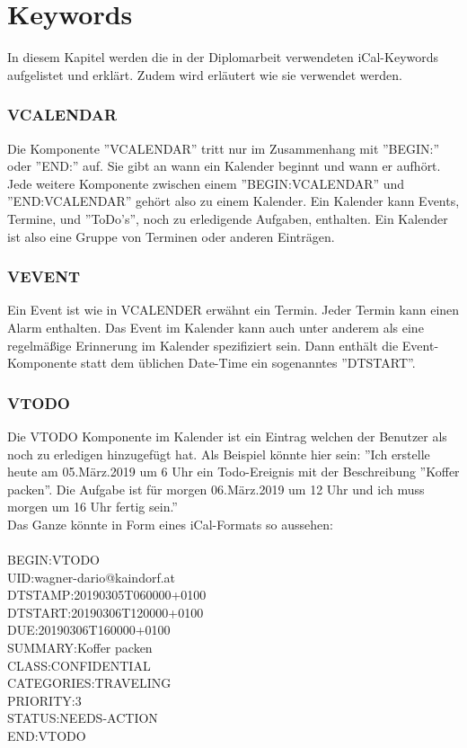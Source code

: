 \section{Keywords} 
\label{sec:keywords}
\renewcommand{\theauthor}{Dario Wagner}
In diesem Kapitel werden die in der Diplomarbeit verwendeten iCal-Keywords aufgelistet und erklärt. Zudem wird erläutert wie sie verwendet werden. 
\subsubsection{VCALENDAR}
\label{sec:vCalendar}
Die Komponente ''VCALENDAR'' tritt nur im Zusammenhang mit ''BEGIN:'' oder ''END:'' auf. Sie gibt an wann ein Kalender beginnt und wann er aufhört. Jede weitere Komponente zwischen einem ''BEGIN:VCALENDAR'' und ''END:VCALENDAR'' gehört also zu einem Kalender. Ein Kalender kann Events, Termine, und ''ToDo's'', noch zu erledigende Aufgaben, enthalten. Ein Kalender ist also eine Gruppe von Terminen oder anderen Einträgen. 
\subsubsection{VEVENT} 
\label{sec:vEvent}
Ein Event ist wie in VCALENDER erwähnt ein Termin. Jeder Termin kann einen Alarm enthalten. Das Event im Kalender kann auch unter anderem als eine regelmäßige Erinnerung im Kalender spezifiziert sein. Dann enthält die Event-Komponente statt dem üblichen Date-Time ein sogenanntes ''DTSTART''.
\subsubsection{VTODO}
\label{sec:vTodo} 
Die VTODO Komponente im Kalender ist ein Eintrag welchen der Benutzer als noch zu erledigen hinzugefügt hat. Als Beispiel könnte hier sein: ''Ich erstelle heute am 05.März.2019 um 6 Uhr ein Todo-Ereignis mit der Beschreibung ''Koffer packen''. Die Aufgabe ist für morgen 06.März.2019 um 12 Uhr und ich muss morgen um 16 Uhr fertig sein.'' \\
Das Ganze könnte in Form eines iCal-Formats so aussehen: \\ \\
  BEGIN:VTODO \\
  UID:wagner-dario@kaindorf.at\\
  DTSTAMP:20190305T060000+0100\\
  DTSTART:20190306T120000+0100\\
  DUE:20190306T160000+0100\\
  SUMMARY:Koffer packen\\
  CLASS:CONFIDENTIAL\\
  CATEGORIES:TRAVELING\\
  PRIORITY:3\\
  STATUS:NEEDS-ACTION\\
  END:VTODO\\
